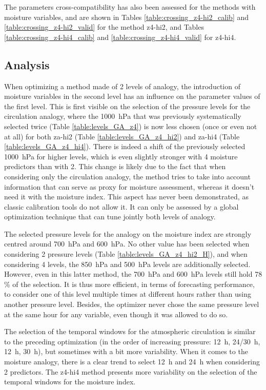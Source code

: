 \documentclass[twocol]{ametsoc}
\begin{document}
The parameters cross-compatibility has also been assessed for the methods with moisture variables, and are shown in Tables \ref{table:crossing_z4-hi2_calib} and \ref{table:crossing_z4-hi2_valid} for the method z4-hi2, and Tables \ref{table:crossing_z4-hi4_calib} and \ref{table:crossing_z4-hi4_valid} for z4-hi4.


\subsection{Analysis}

When optimizing a method made of 2 levels of analogy, the introduction of moisture variables in the second level has an influence on the parameter values of the first level. This is first visible on the selection of the pressure levels for the circulation analogy, where the 1000~hPa that was previously systematically selected twice (Table \ref{table:levels_GA_z4}) is now less chosen (once or even not at all) for both za-hi2 (Table \ref{table:levels_GA_z4_hi2}) and za-hi4 (Table \ref{table:levels_GA_z4_hi4}). There is indeed a shift of the previously selected 1000~hPa for higher levels, which is even slightly stronger with 4 moisture predictors than with 2. This change is likely due to the fact that when considering only the circulation analogy, the method tries to take into account information that can serve as proxy for moisture assessment, whereas it doesn't need it with the moisture index. This aspect has never been demonstrated, as classic calibration tools do not allow it. It can only be assessed by a global optimization technique that can tune jointly both levels of analogy. 

The selected pressure levels for the analogy on the moisture index are strongly centred around 700~hPa and 600~hPa. No other value has been selected when considering 2 pressure levels (Table \ref{table:levels_GA_z4_hi2_H}), and when considering 4 levels, the 850~hPa and 500~hPa levels are additionally selected. However, even in this latter method, the 700~hPa and 600~hPa levels still hold 78 \% of the selection. It is thus more efficient, in terms of forecasting performance, to consider one of this level multiple times at different hours rather than using another pressure level. Besides, the optimizer never chose the same pressure level at the same hour for any variable, even though it was allowed to do so.

The selection of the temporal windows for the atmospheric circulation is similar to the preceding optimization (in the order of increasing pressure: 12~h, 24/30~h, 12~h, 30~h), but sometimes with a bit more variability. When it comes to the moisture analogy, there is a clear trend to select 12~h and 24~h when considering 2 predictors. The z4-hi4 method presents more variability on the selection of the temporal windows for the moisture index.
\end{document}
